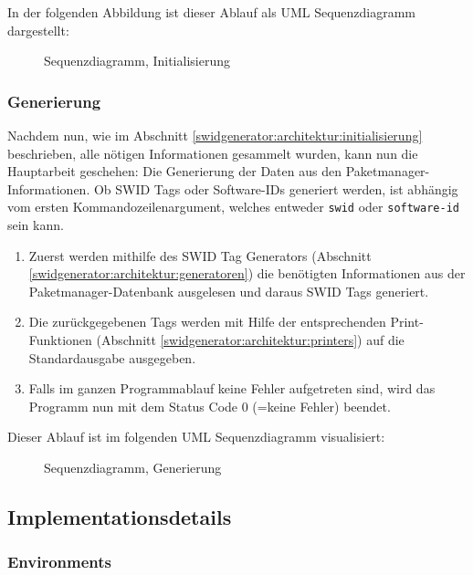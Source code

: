 In der folgenden Abbildung ist dieser Ablauf als UML Sequenzdiagramm
dargestellt:

\begin{figure}[H]
	\centering
	
	\caption{Sequenzdiagramm, Initialisierung}
\end{figure}

\subsubsection{Generierung}
\label{swidgenerator:architektur:generierung}

Nachdem nun, wie im Abschnitt \ref{swidgenerator:architektur:initialisierung}
beschrieben, alle nötigen Informationen gesammelt wurden, kann nun die
Hauptarbeit geschehen: Die Generierung der Daten aus den
Paketmanager-Informationen. Ob SWID Tags oder Software-IDs generiert werden, ist
abhängig vom ersten Kommandozeilenargument, welches entweder \texttt{swid} oder
\texttt{software-id} sein kann.

\begin{enumerate}
	\item Zuerst werden mithilfe des SWID Tag Generators (Abschnitt
	\ref{swidgenerator:architektur:generatoren}) die benötigten Informationen aus
	der Paketmanager-Datenbank ausgelesen und daraus SWID Tags generiert.
		
	\item Die zurückgegebenen Tags werden mit Hilfe der entsprechenden
	Print-Funktionen (Abschnitt \ref{swidgenerator:architektur:printers}) auf die
	Standardausgabe ausgegeben.
		
	\item Falls im ganzen Programmablauf keine Fehler aufgetreten sind, wird das
	Programm nun mit dem Status Code 0 (=keine Fehler) beendet.
\end{enumerate}

Dieser Ablauf ist im folgenden UML Sequenzdiagramm visualisiert:

\begin{figure}[H]
	\centering
	
	\caption{Sequenzdiagramm, Generierung}
\end{figure}


\subsection{Implementationsdetails}

\subsubsection{Environments}
\label{swidgenerator:architektur:environments}

